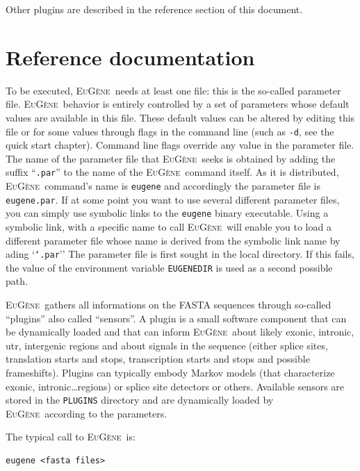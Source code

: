 \documentclass[a4paper,titlepage]{report}
\newcommand{\EuGene}{\textsc{EuG\`ene}}
\begin{document}
\begin{Verbatim}[fontsize=\scriptsize]
\end{Verbatim}

Other plugins are described in the reference section of this document.

\newpage
\chapter{Reference documentation}

To be executed, \EuGene\ needs at least one file: this is the
so-called parameter file.  \EuGene\ behavior is entirely controlled
by a set of parameters whose default values are available in this
file. These default values can be altered by editing this file or for
some values through flags in the command line (such as \texttt{-d},
see the quick start chapter). Command line flags override any value in the parameter
file. The name of the parameter file that \EuGene\ seeks is obtained
by adding the suffix ``\texttt{.par}'' to the name of the \EuGene\ 
command itself.  As it is distributed, \EuGene\ command's name is
\texttt{eugene} and accordingly the parameter file is
\texttt{eugene.par}. If at some point you want to use several
different parameter files, you can simply use symbolic links to the
\texttt{eugene} binary executable. Using a symbolic link, with a
specific name to call \EuGene\ will enable you to load a different
parameter file whose name is derived from the symbolic link name by
ading `\texttt{`.par}'' The parameter file is first sought in the
local directory.  If this fails, the value of the environment variable
\texttt{EUGENEDIR} is used as a second possible path.

\EuGene\ gathers all informations on the FASTA sequences through
so-called ``plugins'' also called ``sensors''. A plugin is a small
software component that can be dynamically loaded and that can inform
\EuGene\ about likely exonic, intronic, utr, intergenic regions and
about signals in the sequence (either splice sites, translation starts
and stops, transcription starts and stops and possible frameshifts).
Plugins can typically embody Markov models (that characterize exonic,
intronic\ldots regions) or splice site detectors or others.  Available
sensors are stored in the \texttt{PLUGINS} directory and are
dynamically loaded by \EuGene\ according to the parameters.

The typical call to \EuGene\ is:

\begin{Verbatim}[fontsize=\small]
eugene <fasta files>
\end{Verbatim}
\end{document}
